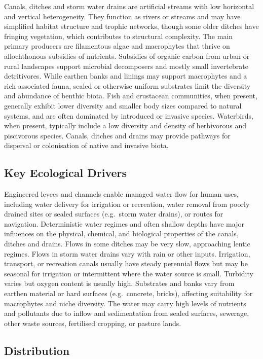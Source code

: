 \documentclass[
  letterpaper,
  DIV=11,
  numbers=noendperiod]{scrartcl}
\begin{document}
Canals, ditches and storm water drains are artificial streams with low
horizontal and vertical heterogeneity. They function as rivers or
streams and may have simplified habitat structure and trophic networks,
though some older ditches have fringing vegetation, which contributes to
structural complexity. The main primary producers are filamentous algae
and macrophytes that thrive on allochthonous subsidies of nutrients.
Subsidies of organic carbon from urban or rural landscapes support
microbial decomposers and mostly small invertebrate detritivores. While
earthen banks and linings may support macrophytes and a rich associated
fauna, sealed or otherwise uniform substrates limit the diversity and
abundance of benthic biota. Fish and crustacean communities, when
present, generally exhibit lower diversity and smaller body sizes
compared to natural systems, and are often dominated by introduced or
invasive species. Waterbirds, when present, typically include a low
diversity and density of herbivorous and piscivorous species. Canals,
ditches and drains may provide pathways for dispersal or colonisation of
native and invasive biota.

\subsection{Key Ecological Drivers}\label{key-ecological-drivers-21}

Engineered levees and channels enable managed water flow for human uses,
including water delivery for irrigation or recreation, water removal
from poorly drained sites or sealed surfaces (e.g.~storm water drains),
or routes for navigation. Deterministic water regimes and often shallow
depths have major influences on the physical, chemical, and biological
properties of the canals, ditches and drains. Flows in some ditches may
be very slow, approaching lentic regimes. Flows in storm water drains
vary with rain or other inputs. Irrigation, transport, or recreation
canals usually have steady perennial flows but may be seasonal for
irrigation or intermittent where the water source is small. Turbidity
varies but oxygen content is usually high. Substrates and banks vary
from earthen material or hard surfaces (e.g.~concrete, bricks),
affecting suitability for macrophytes and niche diversity. The water may
carry high levels of nutrients and pollutants due to inflow and
sedimentation from sealed surfaces, sewerage, other waste sources,
fertilised cropping, or pasture lands.

\subsection{Distribution}\label{distribution-21}
\end{document}
